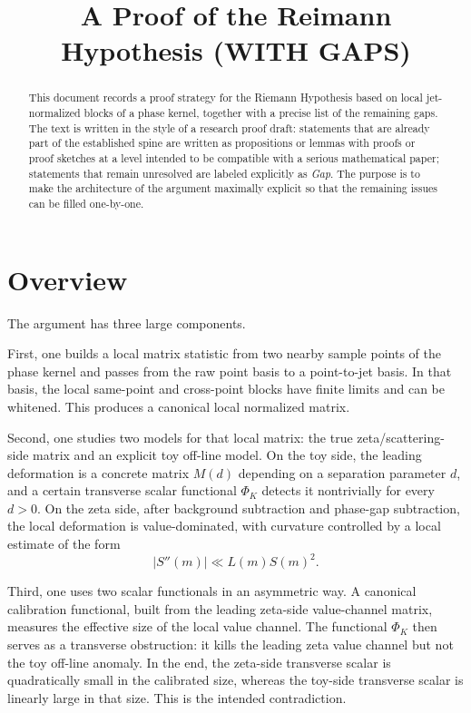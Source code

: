 \documentclass[11pt]{article}
\title{A Proof of the Reimann Hypothesis (WITH GAPS)}
\author{}
\date{}
\theoremstyle{plain}
\theoremstyle{definition}
\newcommand{\abs}[1]{\left\lvert #1\right\rvert}
\begin{document}
\maketitle

\begin{abstract}
This document records a proof strategy for the Riemann Hypothesis based on local jet-normalized blocks of a phase kernel, together with a precise list of the remaining gaps. The text is written in the style of a research proof draft: statements that are already part of the established spine are written as propositions or lemmas with proofs or proof sketches at a level intended to be compatible with a serious mathematical paper; statements that remain unresolved are labeled explicitly as \emph{Gap}. The purpose is to make the architecture of the argument maximally explicit so that the remaining issues can be filled one-by-one.
\end{abstract}

\tableofcontents

\section{Overview}

The argument has three large components.

First, one builds a local matrix statistic from two nearby sample points of the phase kernel and passes from the raw point basis to a point-to-jet basis. In that basis, the local same-point and cross-point blocks have finite limits and can be whitened. This produces a canonical local normalized matrix.

Second, one studies two models for that local matrix: the true zeta/scattering-side matrix and an explicit toy off-line model. On the toy side, the leading deformation is a concrete matrix $M(d)$ depending on a separation parameter $d$, and a certain transverse scalar functional $\Phi_K$ detects it nontrivially for every $d>0$. On the zeta side, after background subtraction and phase-gap subtraction, the local deformation is value-dominated, with curvature controlled by a local estimate of the form
\[
\abs{S''(m)}\ll L(m)S(m)^2.
\]

Third, one uses two scalar functionals in an asymmetric way. A canonical calibration functional, built from the leading zeta-side value-channel matrix, measures the effective size of the local value channel. The functional $\Phi_K$ then serves as a transverse obstruction: it kills the leading zeta value channel but not the toy off-line anomaly. In the end, the zeta-side transverse scalar is quadratically small in the calibrated size, whereas the toy-side transverse scalar is linearly large in that size. This is the intended contradiction.
\end{document}
